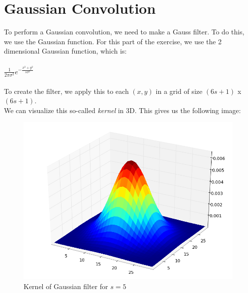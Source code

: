 \documentclass[10pt,a4paper]{article}
\begin{document}
\section{Gaussian Convolution}

To perform a Gaussian convolution, we need to make a Gauss filter. To
do this, we use the Gaussian function. For this part of the exercise,
we use the 2 dimensional Gaussian function, which is:\\
\\
$\frac{1}{2\pi \sigma^2}e^{-\frac{x^2 + y^2}{s\sigma^2}}$\\
\\
To create the filter, we apply this to each $(x, y)$ in a grid of size
$(6s + 1)$ x $(6s + 1)$.\\
We can visualize this so-called \emph{kernel} in 3D. This gives us the
following image:
\begin{figure}[H]
	\includegraphics[scale=0.4]{kernel.png}
	\caption{Kernel of Gaussian filter for $s=5$}
\end{figure}
\end{document}
